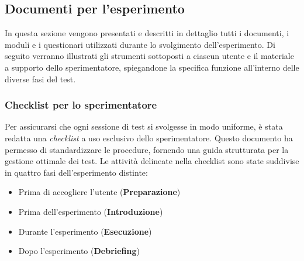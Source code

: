\subsection{Documenti per l'esperimento}
In questa sezione vengono presentati e descritti in dettaglio tutti i documenti, i moduli e i questionari utilizzati durante lo svolgimento dell'esperimento. Di seguito verranno illustrati gli strumenti sottoposti a ciascun utente e il materiale a supporto dello sperimentatore, spiegandone la specifica funzione all'interno delle diverse fasi del test.

\subsubsection{Checklist per lo sperimentatore}
Per assicurarsi che ogni sessione di test si svolgesse in modo uniforme, è stata redatta una \textit{checklist} a uso esclusivo dello sperimentatore. Questo documento ha permesso di standardizzare le procedure, fornendo una guida strutturata per la gestione ottimale dei test. Le attività delineate nella checklist sono state suddivise in quattro fasi dell'esperimento distinte:

\begin{itemize}
    \item Prima di accogliere l'utente (\textbf{Preparazione})
    \item Prima dell'esperimento (\textbf{Introduzione})
    \item Durante l'esperimento (\textbf{Esecuzione})
    \item Dopo l'esperimento (\textbf{Debriefing})
\end{itemize}


